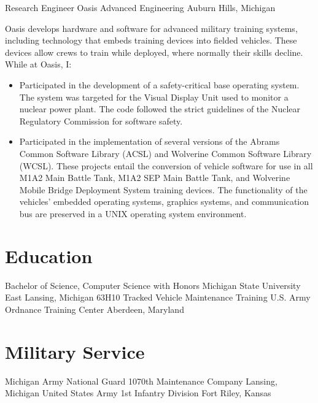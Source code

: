 \documentclass[11pt,letterpaper]{moderncv}
\begin{document}
 {Research Engineer} {Oasis Advanced Engineering}
         {Auburn Hills, Michigan} {}
{
  Oasis develops hardware and software for advanced military training
  systems, including technology that embeds training devices into
  fielded vehicles. These devices allow crews to train while deployed,
  where normally their skills decline.\newline
  While at Oasis, I:
  \begin{itemize}
  \item Participated in the development of a safety-critical base
    operating system. The system was targeted for the Visual Display
    Unit used to monitor a nuclear power plant. The code followed the
    strict guidelines of the Nuclear Regulatory Commission for
    software safety.
  \item Participated in the implementation of several versions of the
    Abrams Common Software Library (ACSL) and Wolverine Common
    Software Library (WCSL). These projects entail the conversion of
    vehicle software for use in all M1A2 Main Battle Tank, M1A2 SEP
    Main Battle Tank, and Wolverine Mobile Bridge Deployment System
    training devices. The functionality of the vehicles' embedded
    operating systems, graphics systems, and communication bus are
    preserved in a UNIX operating system environment.
  \end{itemize}
}


\section{Education}
 {Bachelor of Science, Computer Science with Honors}
         {\newline Michigan State University} {East Lansing, Michigan} {} {}
 {63H10 Tracked Vehicle Maintenance Training}
         {\newline U.S. Army Ordnance Training Center} {Aberdeen, Maryland} {}
         {}

\section{Military Service}
 {Michigan Army National Guard}
         {\newline 1070th Maintenance Company} {Lansing, Michigan} {} {}
 {United States Army}
         {1st Infantry Division} {Fort Riley, Kansas} {} {}
\end{document}
